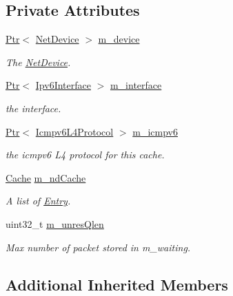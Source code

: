 \subsection*{Private Attributes}
\begin{DoxyCompactItemize}
\item 
\hyperlink{classns3_1_1Ptr}{Ptr}$<$ \hyperlink{classns3_1_1NetDevice}{Net\+Device} $>$ \hyperlink{classns3_1_1NdiscCache_a7c47880e5c9b373c3082b710bef76474}{m\+\_\+device}
\begin{DoxyCompactList}\small\item\em The \hyperlink{classns3_1_1NetDevice}{Net\+Device}. \end{DoxyCompactList}\item 
\hyperlink{classns3_1_1Ptr}{Ptr}$<$ \hyperlink{classns3_1_1Ipv6Interface}{Ipv6\+Interface} $>$ \hyperlink{classns3_1_1NdiscCache_a33509245882036c5fffe38f29c71dcff}{m\+\_\+interface}
\begin{DoxyCompactList}\small\item\em the interface. \end{DoxyCompactList}\item 
\hyperlink{classns3_1_1Ptr}{Ptr}$<$ \hyperlink{classns3_1_1Icmpv6L4Protocol}{Icmpv6\+L4\+Protocol} $>$ \hyperlink{classns3_1_1NdiscCache_adddcf05355092f4623c6defce1f0505a}{m\+\_\+icmpv6}
\begin{DoxyCompactList}\small\item\em the icmpv6 L4 protocol for this cache. \end{DoxyCompactList}\item 
\hyperlink{classns3_1_1NdiscCache_a1267c82e138fe8aac2cfd543e7aa7181}{Cache} \hyperlink{classns3_1_1NdiscCache_ac6da3eccbeb132dc62cecc518d025345}{m\+\_\+nd\+Cache}
\begin{DoxyCompactList}\small\item\em A list of \hyperlink{classns3_1_1NdiscCache_1_1Entry}{Entry}. \end{DoxyCompactList}\item 
uint32\+\_\+t \hyperlink{classns3_1_1NdiscCache_afa9d648bb6cc53990980168b185e04d9}{m\+\_\+unres\+Qlen}
\begin{DoxyCompactList}\small\item\em Max number of packet stored in m\+\_\+waiting. \end{DoxyCompactList}\end{DoxyCompactItemize}
\subsection*{Additional Inherited Members}


